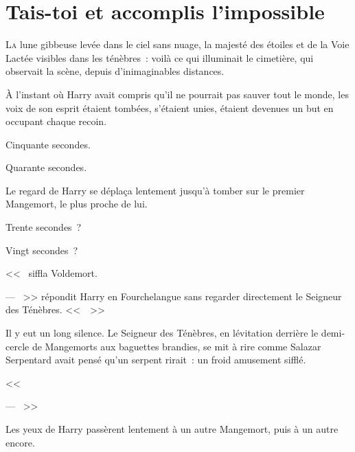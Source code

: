 \chapter{Tais-toi et accomplis l'impossible}

\lettrine{L}{a} lune gibbeuse levée dans le ciel sans nuage, la majesté des étoiles et de la Voie Lactée visibles dans les ténèbres~: voilà ce qui illuminait le cimetière, qui observait la scène, depuis d'inimaginables distances.

À l'instant où Harry avait compris qu'il ne pourrait pas sauver tout le monde, les voix de son esprit étaient tombées, s'étaient unies, étaient devenues un but en occupant chaque recoin.

Cinquante secondes.

Quarante secondes.

Le regard de Harry se déplaça lentement jusqu'à tomber sur le premier Mangemort, le plus proche de lui.

Trente secondes~?

Vingt secondes~?

<<~ siffla Voldemort.

--- ~>> répondit Harry en Fourchelangue sans regarder directement le Seigneur des Ténèbres. <<~~>>

Il y eut un long silence. Le Seigneur des Ténèbres, en lévitation derrière le demi-cercle de Mangemorts aux baguettes brandies, se mit à rire comme Salazar Serpentard avait pensé qu'un serpent rirait~: un froid amusement sifflé.

<<~

--- ~>>

Les yeux de Harry passèrent lentement à un autre Mangemort, puis à un autre encore.

